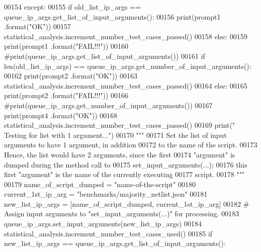 \begin{DoxyCode}
00154         \textcolor{keywordflow}{except}:
00155             \textcolor{keywordflow}{if} old\_list\_ip\_args == queue\_ip\_args.get\_list\_of\_input\_arguments():
00156                 print(prompt1 .format(\textcolor{stringliteral}{"OK"}))
00157                 statistical\_analysis.increment\_number\_test\_cases\_passed()
00158             \textcolor{keywordflow}{else}:
00159                 print(prompt1 .format(\textcolor{stringliteral}{"FAIL!!!"}))
00160                 \textcolor{comment}{#print(queue\_ip\_args.get\_list\_of\_input\_arguments())}
00161             \textcolor{keywordflow}{if} len(old\_list\_ip\_args) == queue\_ip\_args.get\_number\_of\_input\_arguments():
00162                 print(prompt2 .format(\textcolor{stringliteral}{"OK"}))
00163                 statistical\_analysis.increment\_number\_test\_cases\_passed()
00164             \textcolor{keywordflow}{else}:
00165                 print(prompt2 .format(\textcolor{stringliteral}{"FAIL!!!"}))
00166                 \textcolor{comment}{#print(queue\_ip\_args.get\_number\_of\_input\_arguments())}
00167             print(prompt4 .format(\textcolor{stringliteral}{"OK"}))
00168             statistical\_analysis.increment\_number\_test\_cases\_passed()
00169         print(\textcolor{stringliteral}{" Testing for list with 1 argument..."})
00170         \textcolor{stringliteral}{"""}
00171 \textcolor{stringliteral}{            Set the list of input arguments to have 1 argument, in addition}
00172 \textcolor{stringliteral}{                to the name of the script.}
00173 \textcolor{stringliteral}{            Hence, the list would have 2 arguments, since the first}
00174 \textcolor{stringliteral}{                "argument" is dumped during the method call to}
00175 \textcolor{stringliteral}{                set\_input\_arguments(...);}
00176 \textcolor{stringliteral}{                this first "argument" is the name of the currently executing}
00177 \textcolor{stringliteral}{                    script.}
00178 \textcolor{stringliteral}{        """}
00179         name\_of\_script\_dumped = \textcolor{stringliteral}{"name-of-the-script"}
00180         current\_1st\_ip\_arg = \textcolor{stringliteral}{"benchmarks/majority\_netlist.json"}
00181         new\_list\_ip\_args = [name\_of\_script\_dumped, current\_1st\_ip\_arg]
00182         \textcolor{comment}{#   Assign input arguments to "set\_input\_arguments(...)" for processing.}
00183         queue\_ip\_args.set\_input\_arguments(new\_list\_ip\_args)
00184         statistical\_analysis.increment\_number\_test\_cases\_used()
00185         \textcolor{keywordflow}{if} new\_list\_ip\_args == queue\_ip\_args.get\_list\_of\_input\_arguments():

\end{DoxyCode}
